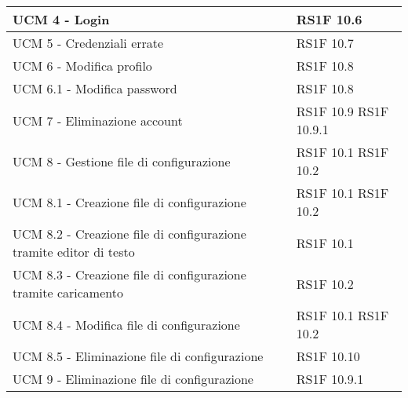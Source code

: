 \begin{center}
\begin{longtable}{ | p{5cm} | p{5cm} |}
            UCM 4 - Login &  RS1F 10.6 \newline  \\ \hline      
            UCM 5 - Credenziali errate &  RS1F 10.7 \newline  \\ \hline      
            UCM 6 - Modifica profilo &  RS1F 10.8 \newline  \\ \hline      
            UCM 6.1 - Modifica password &  RS1F 10.8 \newline  \\ \hline      
            UCM 7 - Eliminazione account &  RS1F 10.9 \newline  RS1F 10.9.1 \newline  \\ \hline      
            UCM 8 - Gestione file di configurazione &  RS1F 10.1 \newline  RS1F 10.2 \newline  \\ \hline      
            UCM 8.1 - Creazione file di configurazione &  RS1F 10.1 \newline  RS1F 10.2 \newline  \\ \hline      
            UCM 8.2 - Creazione file di configurazione tramite editor di testo &  RS1F 10.1 \newline  \\ \hline      
            UCM 8.3 - Creazione file di configurazione tramite caricamento &  RS1F 10.2 \newline  \\ \hline      
            UCM 8.4 - Modifica file di configurazione &  RS1F 10.1 \newline  RS1F 10.2 \newline  \\ \hline      
            UCM 8.5 - Eliminazione file di configurazione &  RS1F 10.10 \newline  \\ \hline      
            UCM 9 - Eliminazione file di configurazione &  RS1F 10.9.1 \newline  \\ \hline     
      \end{longtable}
      \egroup
      \end{center}  
\clearpage

